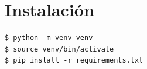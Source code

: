 \chapter{Instalación}
\begin{lstlisting}[style=terminal]
$ python -m venv venv
$ source venv/bin/activate
$ pip install -r requirements.txt
\end{lstlisting}
